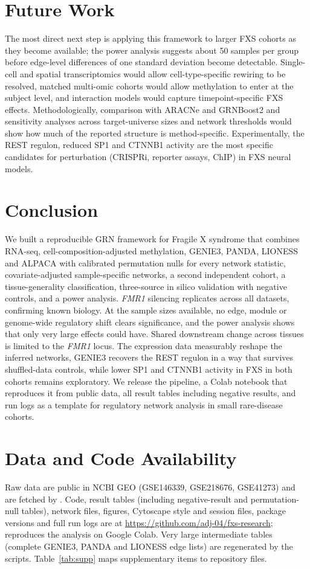 \documentclass[journal]{IEEEtran}
\newcommand{\gene}[1]{\textit{#1}}
\begin{document}
\section{Future Work}
The most direct next step is applying this framework to larger FXS cohorts as they become available; the power analysis suggests about 50 samples per group before edge-level differences of one standard deviation become detectable. Single-cell and spatial transcriptomics would allow cell-type-specific rewiring to be resolved, matched multi-omic cohorts would allow methylation to enter at the subject level, and interaction models would capture timepoint-specific FXS effects. Methodologically, comparison with ARACNe and GRNBoost2 and sensitivity analyses across target-universe sizes and network thresholds would show how much of the reported structure is method-specific. Experimentally, the REST regulon, reduced SP1 and CTNNB1 activity are the most specific candidates for perturbation (CRISPRi, reporter assays, ChIP) in FXS neural models.

\section{Conclusion}
We built a reproducible GRN framework for Fragile X syndrome that combines RNA-seq, cell-composition-adjusted methylation, GENIE3, PANDA, LIONESS and ALPACA with calibrated permutation nulls for every network statistic, covariate-adjusted sample-specific networks, a second independent cohort, a tissue-generality classification, three-source in silico validation with negative controls, and a power analysis. \gene{FMR1} silencing replicates across all datasets, confirming known biology. At the sample sizes available, no edge, module or genome-wide regulatory shift clears significance, and the power analysis shows that only very large effects could have. Shared downstream change across tissues is limited to the \gene{FMR1} locus. The expression data measurably reshape the inferred networks, GENIE3 recovers the REST regulon in a way that survives shuffled-data controls, while lower SP1 and CTNNB1 activity in FXS in both cohorts remains exploratory. We release the pipeline, a Colab notebook that reproduces it from public data, all result tables including negative results, and run logs as a template for regulatory network analysis in small rare-disease cohorts.

\section*{Data and Code Availability}
Raw data are public in NCBI GEO (GSE146339, GSE218676, GSE41273) and are fetched by . Code, result tables (including negative-result and permutation-null tables), network files, figures, Cytoscape style and session files, package versions and full run logs are at \url{https://github.com/adj-04/fxs-research};  reproduces the analysis on Google Colab. Very large intermediate tables (complete GENIE3, PANDA and LIONESS edge lists) are regenerated by the scripts. Table~\ref{tab:supp} maps supplementary items to repository files.
\end{document}
